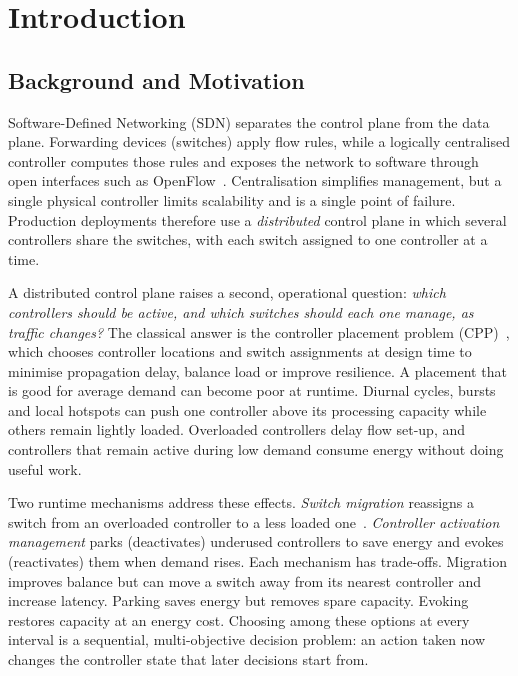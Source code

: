 \chapter{Introduction}
\label{ch:intro}

\section{Background and Motivation}
\label{sec:background}

Software-Defined Networking (SDN) separates the control plane from the data plane. Forwarding devices (switches) apply flow rules, while a logically centralised controller computes those rules and exposes the network to software through open interfaces such as OpenFlow~\cite{mckeown2008openflow,kreutz2015sdn}. Centralisation simplifies management, but a single physical controller limits scalability and is a single point of failure. Production deployments therefore use a \emph{distributed} control plane in which several controllers share the switches, with each switch assigned to one controller at a time.

A distributed control plane raises a second, operational question: \emph{which controllers should be active, and which switches should each one manage, as traffic changes?} The classical answer is the controller placement problem (CPP)~\cite{heller2012cpp,das2020survey}, which chooses controller locations and switch assignments at design time to minimise propagation delay, balance load or improve resilience. A placement that is good for average demand can become poor at runtime. Diurnal cycles, bursts and local hotspots can push one controller above its processing capacity while others remain lightly loaded. Overloaded controllers delay flow set-up, and controllers that remain active during low demand consume energy without doing useful work.

Two runtime mechanisms address these effects. \emph{Switch migration} reassigns a switch from an overloaded controller to a less loaded one~\cite{dixit2013elasticon,yeo2021sarlb}. \emph{Controller activation management} parks (deactivates) underused controllers to save energy and evokes (reactivates) them when demand rises. Each mechanism has trade-offs. Migration improves balance but can move a switch away from its nearest controller and increase latency. Parking saves energy but removes spare capacity. Evoking restores capacity at an energy cost. Choosing among these options at every interval is a sequential, multi-objective decision problem: an action taken now changes the controller state that later decisions start from.

